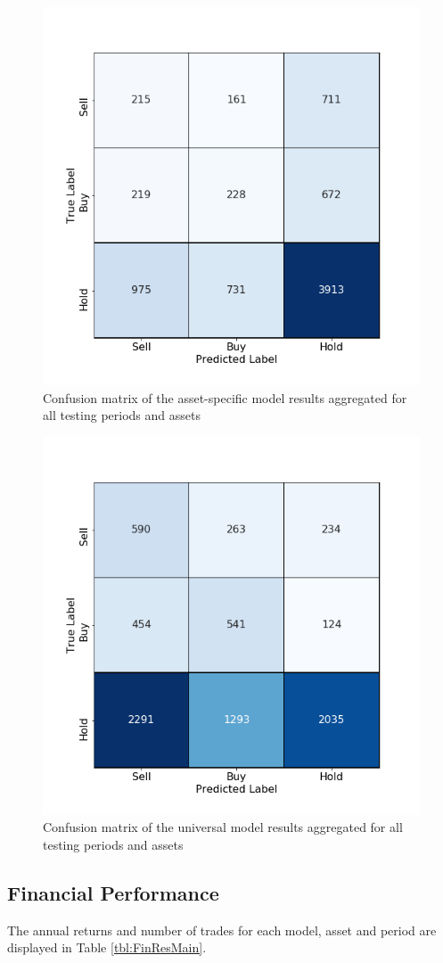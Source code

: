 \documentclass[11pt, a4paper]{article}
\begin{document}
\begin{figure}[H]
    \centering
    \includegraphics[width=.6\textwidth]{images/CMs/CM_indiv_aggreg.png}
    \caption{Confusion matrix of the asset-specific model results aggregated for all testing periods and assets}
    \label{fig:CMAggrI}
\end{figure}

\begin{figure}[H]
    \centering
    \includegraphics[width=.6\textwidth]{images/CMs/CM_univ_aggreg.png}
    \caption{Confusion matrix of the universal model results aggregated for all testing periods and assets}
    \label{fig:CMAggrU}
\end{figure}

\subsection{Financial Performance}
\label{subsec:ER:FinPerf}

The annual returns and number of trades for each model, asset and period are displayed in Table \ref{tbl:FinResMain}. 
\end{document}
